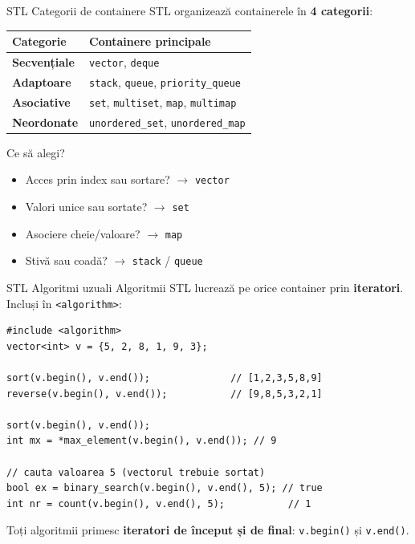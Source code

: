 ﻿\documentclass{beamer}
\begin{document}
\begin{frame}{STL \textemdash{} Categorii de containere}
  STL organizează containerele în \textbf{4 categorii}:

  \smallskip
  \begin{center}
  \footnotesize
  \begin{tabular}{ll}
    \toprule
    Categorie & Containere principale \\
    \midrule
    \textbf{Secvențiale}  & \texttt{vector}, \texttt{deque} \\[3pt]
    \textbf{Adaptoare}    & \texttt{stack}, \texttt{queue}, \texttt{priority\_queue} \\[3pt]
    \textbf{Asociative}   & \texttt{set}, \texttt{multiset}, \texttt{map}, \texttt{multimap} \\[3pt]
    \textbf{Neordonate}   & \texttt{unordered\_set}, \texttt{unordered\_map} \\
    \bottomrule
  \end{tabular}
  \end{center}

  \smallskip
  \begin{block}{Ce să alegi?}
    \begin{itemize}\footnotesize\itemsep1pt
      \item Acces prin index sau sortare? $\rightarrow$ \texttt{vector}
      \item Valori unice sau sortate? $\rightarrow$ \texttt{set}
      \item Asociere cheie/valoare? $\rightarrow$ \texttt{map}
      \item Stivă sau coadă? $\rightarrow$ \texttt{stack} / \texttt{queue}
    \end{itemize}
  \end{block}
\end{frame}

\begin{frame}[fragile]{STL \textemdash{} Algoritmi uzuali}
  Algoritmii STL lucrează pe orice container prin \textbf{iteratori}.
  Incluși în \texttt{<algorithm>}:

  \begin{lstlisting}
#include <algorithm>
vector<int> v = {5, 2, 8, 1, 9, 3};

sort(v.begin(), v.end());              // [1,2,3,5,8,9]
reverse(v.begin(), v.end());           // [9,8,5,3,2,1]

sort(v.begin(), v.end());
int mx = *max_element(v.begin(), v.end()); // 9

// cauta valoarea 5 (vectorul trebuie sortat)
bool ex = binary_search(v.begin(), v.end(), 5); // true
int nr = count(v.begin(), v.end(), 5);           // 1
  \end{lstlisting}

  \smallskip
  Toți algoritmii primesc \textbf{iteratori de început și de final}:
  \texttt{v.begin()} și \texttt{v.end()}.
\end{frame}
\end{document}
